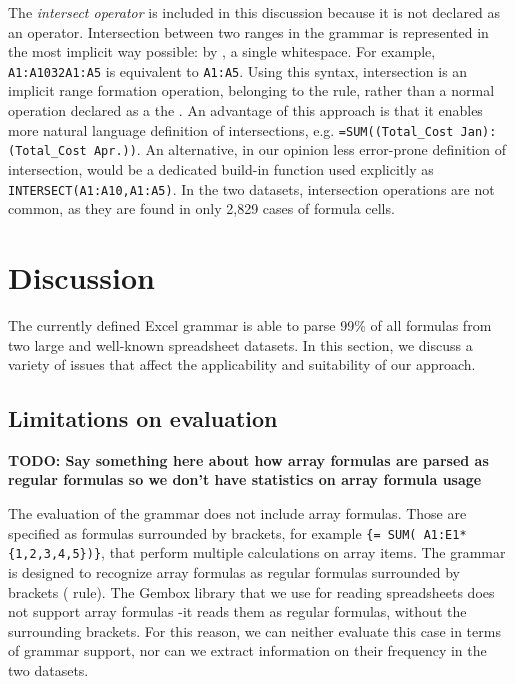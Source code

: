 \documentclass[conference]{IEEEtran}
\newcommand{\todo}[1]{\textbf{TODO: #1}}
\begin{document}
The \textit{intersect operator} is included in this discussion because it is not declared as an operator. Intersection between two ranges in the grammar is represented in the most implicit way possible: by \texttt{}, a single whitespace. For example, \texttt{A1:A10\char32A1:A5} is equivalent to \texttt{A1:A5}. Using this syntax, intersection is an implicit range formation operation, belonging to the  rule, rather than a normal operation declared as a the . An advantage of this approach is that it enables more natural language definition of intersections, e.g.  \texttt{=SUM((Total_Cost Jan):(Total_Cost Apr.))}. An alternative, in our opinion less error-prone definition of intersection, would be a dedicated build-in function used explicitly as \texttt{INTERSECT(A1:A10,A1:A5)}. In the two datasets, intersection operations are not common, as they are found in only 2,829 cases of formula cells.

\section{Discussion}
The currently defined Excel grammar is able to parse 99\% of all formulas from two large and well-known spreadsheet datasets. In this section, we discuss a variety of issues that affect the applicability and suitability of our approach.

\label{sec:discussion}

\subsection{Limitations on evaluation}

\todo{Say something here about how array formulas are parsed as regular formulas so we don't have statistics on array formula usage}

The evaluation of the grammar does not include array formulas.
Those are specified as formulas surrounded by brackets, for example \texttt{\{= SUM( A1:E1*\{1,2,3,4,5\})\}}, that perform multiple calculations on array items. The grammar is designed to recognize array formulas as regular formulas surrounded by brackets ( rule). The Gembox library that we use for reading spreadsheets does not support array formulas -it reads them as regular formulas, without the surrounding brackets. For this reason, we can neither evaluate this case in terms of grammar support, nor can we extract information on their frequency in the two datasets.
\end{document}
